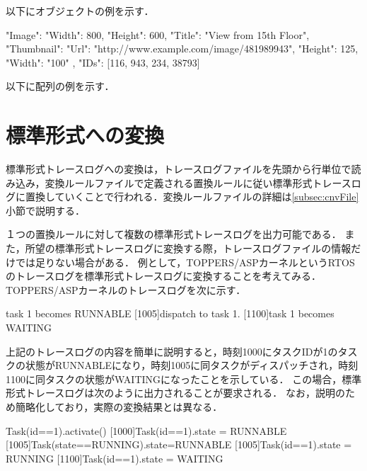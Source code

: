以下にオブジェクトの例を示す．

\begin{File}
{
  "Image":{
    "Width":  800,
    "Height": 600,
    "Title":  "View from 15th Floor",
    "Thumbnail":{
      "Url":    "http://www.example.com/image/481989943",
      "Height": 125,
      "Width":  "100"
    },
    "IDs": [116, 943, 234, 38793]
  }
}
\end{File}

以下に配列の例を示す．

\begin{File}
\end{File}

\section{標準形式への変換}

標準形式トレースログへの変換は，トレースログファイルを先頭から行単位で読み込み，変換ルールファイルで定義される置換ルールに従い標準形式トレースログに置換していくことで行われる．変換ルールファイルの詳細は\ref{subsec:cnvFile}小節で説明する．

１つの置換ルールに対して複数の標準形式トレースログを出力可能である．
また，所望の標準形式トレースログに変換する際，トレースログファイルの情報だけでは足りない場合がある．
例として，TOPPERS/ASPカーネルというRTOSのトレースログを標準形式トレースログに変換することを考えてみる．
TOPPERS/ASPカーネルのトレースログを次に示す．

\begin{File}
[1000]task 1 becomes RUNNABLE
[1005]dispatch to task 1.
[1100]task 1 becomes WAITING
\end{File}

上記のトレースログの内容を簡単に説明すると，時刻1000にタスクIDが1のタスクの状態がRUNNABLEになり，時刻1005に同タスクがディスパッチされ，時刻1100に同タスクの状態がWAITINGになったことを示している．
この場合，標準形式トレースログは次のように出力されることが要求される．
なお，説明のため簡略化しており，実際の変換結果とは異なる．

\begin{File}
[1000]Task(id==1).activate()
[1000]Task(id==1).state = RUNNABLE
[1005]Task(state==RUNNING).state=RUNNABLE
[1005]Task(id==1).state = RUNNING
[1100]Task(id==1).state = WAITING
\end{File}

